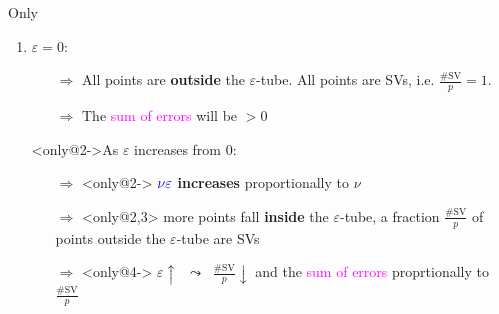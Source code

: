\begin{frame}{Only}
\begin{enumerate}
\item<only@1> $\varepsilon = 0$:
\begin{itemize}
\item[$\Rightarrow$] All points are \textbf{outside} the $\varepsilon$-tube. All points are SVs, i.e. $\frac{\#\mathrm{SV}}{p}=1$.
\item[$\Rightarrow$] The \textcolor{magenta}{sum of errors} will be $> 0$
\end{itemize}
\pause
\item[]<only@2->As $\varepsilon$ increases from $0$:
\begin{itemize}
\item[$\Rightarrow$]<only@2-> ${\color{blue}\nu\varepsilon}$ \textbf{increases} proportionally to $\nu$
\item[$\Rightarrow$]<only@2,3> more points fall \textbf{inside} the $\varepsilon$-tube, a fraction $\frac{\#\mathrm{SV}}{p}$ of points outside the $\varepsilon$-tube are SVs\\
\item[$\Rightarrow$]<only@4->  $\varepsilon \uparrow \;\;\leadsto\;\; \frac{\#\mathrm{SV}}{p} \downarrow$
 and the \textcolor{magenta}{sum of errors} \slidesonly{$\downarrow$} proprtionally to $\frac{\#\mathrm{SV}}{p}$






\end{itemize}
\end{enumerate}
\end{frame}
